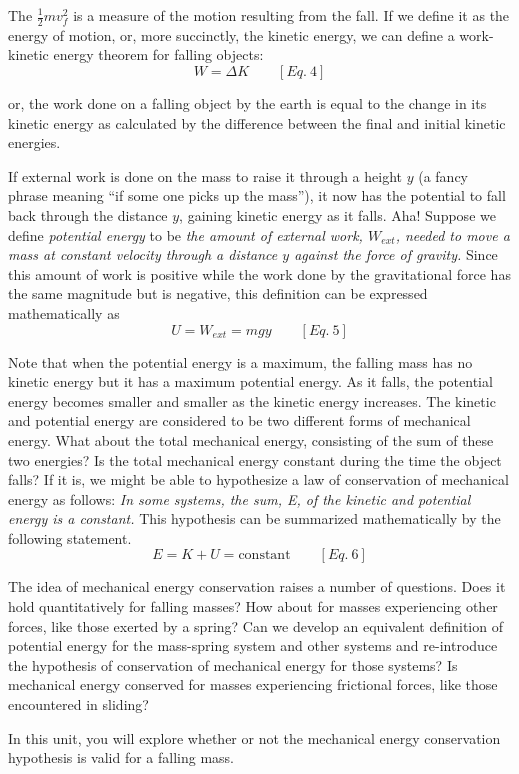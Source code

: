 The \(\frac{1}{2}mv_{f}^{2} \) is a measure of the motion resulting from the fall.
If we define it as the energy of motion, or, more succinctly, the kinetic 
energy, we can define a work-kinetic energy theorem for falling objects:
\[
W=\Delta K\qquad [Eq.\: 4]\]


or, the work done on a falling object by the earth is equal to the change in
its kinetic energy as calculated by the difference between the final and initial
kinetic energies.

If external work is done on the mass to raise it through a height $y$ (a fancy
phrase meaning ``if some one picks up the mass''), it now has
the potential to fall back through the distance $y$, gaining kinetic energy as
it falls. Aha! Suppose we define \textit{potential energy} to be \textit{the
amount of external work, \( W_{ext} \), needed to move a mass at constant velocity
through a distance $y$ against the force of gravity.} Since this amount of work
is positive while the work done by the gravitational force has the same magnitude
but is negative, this definition can be expressed mathematically as
\[
U=W_{ext}=mgy\qquad [Eq.\: 5]\]


Note that when the potential energy is a maximum, the falling mass has no kinetic
energy but it has a maximum potential energy. As it falls, the potential energy
becomes smaller and smaller as the kinetic energy increases. The kinetic and
potential energy are considered to be two different forms of mechanical energy.
What about the total mechanical energy, consisting of the sum of these two energies?
Is the total mechanical energy constant during the time the object falls? If
it is, we might be able to hypothesize a law of conservation of mechanical energy
as follows: \textit{In some systems, the sum, E, of the kinetic and potential
energy is a constant.} This hypothesis can be summarized mathematically by the
following statement.
\[
E=K+U=\mbox{constant}\qquad [Eq.\: 6]\]


The idea of mechanical energy conservation raises a number of questions. Does
it hold quantitatively for falling masses? How about for masses experiencing
other forces, like those exerted by a spring? Can we develop an equivalent definition
of potential energy for the mass-spring system and other systems and re-introduce
the hypothesis of conservation of mechanical energy for those systems? Is mechanical
energy conserved for masses experiencing frictional forces, like those encountered
in sliding?

In this unit, you will explore whether or not the mechanical energy conservation
hypothesis is valid for a falling mass.

